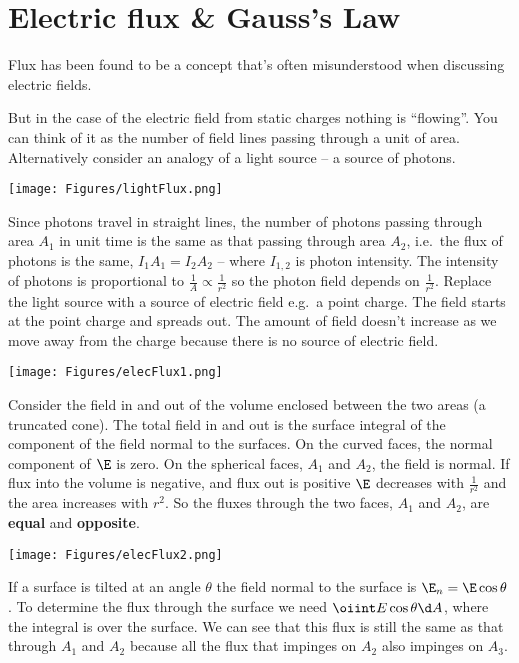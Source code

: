 \documentclass[
]{book}
\theoremstyle{definition}
\theoremstyle{definition}
\theoremstyle{definition}
\theoremstyle{definition}
\theoremstyle{remark}
\begin{document}
\hypertarget{electric-flux-gausss-law}{%
\section{Electric flux \& Gauss's Law}\label{electric-flux-gausss-law}}

Flux has been found to be a concept that's often misunderstood when
discussing electric fields.

But in the case of the electric field from static charges nothing is
``flowing''. You can think of it as the number of field lines passing
through a unit of area. Alternatively consider an analogy of a light
source -- a source of photons.

\texttt{[image: Figures/lightFlux.png]} \protect\hypertarget{fig:lightFlux}{}{}

Since photons travel in straight lines, the number of photons passing
through area \(A_1\) in unit time is the same as that passing through area
\(A_2\), i.e.~the flux of photons is the same, \(I_1 A_1 = I_2 A_2\) --
where \(I_{1,2}\) is photon intensity. The intensity of photons is
proportional to \(\frac{1}{A} \propto \frac{1}{r^2}\) so the photon field
depends on \(\frac{1}{r^2}\). Replace the light source with a source of
electric field e.g.~a point charge. The field starts at the point charge
and spreads out. The amount of field doesn't increase as we move away
from the charge because there is no source of electric field.

\texttt{[image: Figures/elecFlux1.png]} \protect\hypertarget{fig:elecFlux1}{}{}

Consider the field in and out of the volume enclosed between the two
areas (a truncated cone). The total field in and out is the surface
integral of the component of the field normal to the surfaces. On the
curved faces, the normal component of \(\E\) is zero. On the spherical
faces, \(A_1\) and \(A_2\), the field is normal. If flux into the volume is
negative, and flux out is positive \(\E\) decreases with \(\frac{1}{r^2}\)
and the area increases with \(r^2\). So the fluxes through the two faces,
\(A_1\) and \(A_2\), are \textbf{equal} and \textbf{opposite}.

\texttt{[image: Figures/elecFlux2.png]} \protect\hypertarget{fig:elecFlux2}{}{}

If a surface is tilted at an angle \(\theta\) the field normal to the
surface is \(\E_n = \E \cos\theta\). To determine the flux through the
surface we need \(\oiint E \cos\theta \d A\), where the integral is over
the surface. We can see that this flux is still the same as that through
\(A_1\) and \(A_2\) because all the flux that impinges on \(A_2\) also
impinges on \(A_3\).
\end{document}
